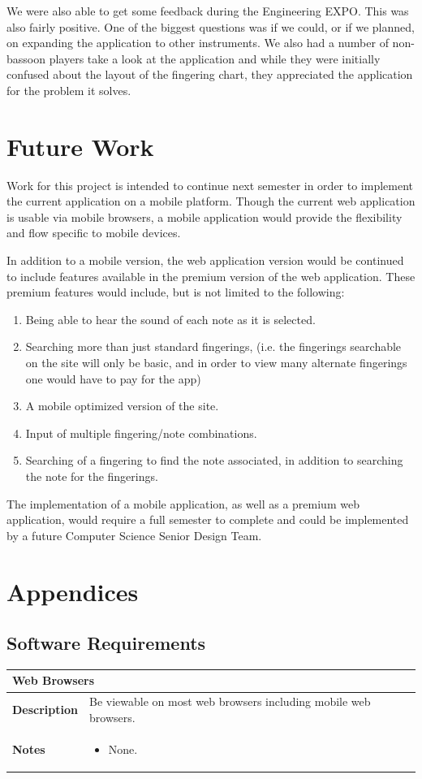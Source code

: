 \documentclass[12pt,english]{article}
\providecommand{\tabularnewline}{\\}
\begin{document}
We were also able to get some feedback during the Engineering EXPO.  This
was also fairly positive.  One of the biggest questions was if we could, or
if we planned, on expanding the application to other instruments.  We also
had a number of non-bassoon players take a look at the application and while
they were initially confused about the layout of the fingering chart, they
appreciated the application for the problem it solves.

\section{Future Work}
Work for this project is intended to continue next semester in order
to implement the current application on a mobile platform. Though
the current web application is usable via mobile browsers, a mobile
application would provide the flexibility and flow specific to mobile
devices.

In addition to a mobile version, the web application version would
be continued to include features available in the premium version
of the web application. These premium features would include, but
is not limited to the following:

\begin{enumerate}
	\item Being able to hear the sound of each note as it is selected. 
	\item Searching more than just standard fingerings, (i.e. the fingerings
		searchable on the site will only be basic, and in order to view many
		alternate fingerings one would have to pay for the app) 
	\item A mobile optimized version of the site. 
	\item Input of multiple fingering/note combinations. 
	\item Searching of a fingering to find the note associated, in addition
		to searching the note for the fingerings. 
\end{enumerate}

The implementation of a mobile application, as well as a premium web
application, would require a full semester to complete and could be
implemented by a future Computer Science Senior Design Team.
\clearpage

\section{Appendices}
\subsection{Software Requirements}
\begin{tabular}{|p{3cm}|p{13cm}|}
	\hline 
	\multicolumn{2}{|l|}{\textbf{Web Browsers}}\tabularnewline
	\hline 
	\textbf{Description}  & Be viewable on most web browsers including mobile web browsers. \tabularnewline
	\hline 
	\textbf{Notes}  & 
		\begin{itemize}
			\item None.
		\end{itemize}
	\tabularnewline
	\hline 
\end{tabular}\\[0.5cm]
\end{document}
